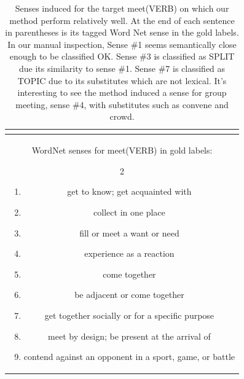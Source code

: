 \documentclass[11pt,a4paper]{article}
\begin{document}
\begin{table}[htp!]
\begin{tabularx}{\linewidth}{| c |  c| X | }
{\begin{itemize}[topsep=0pt,itemsep=0pt, parsep=0pt]
    \end{itemize}}\\
  \hline\hline
    \multicolumn{3}{|p{0.95\linewidth}|}{
    WordNet senses for meet(VERB) in gold labels:
    \begin{multicols}{2}
    \begin{enumerate}[topsep=2pt,itemsep=0pt,partopsep=0pt, parsep=0pt]
        \item get to know; get acquainted with 
        \item collect in one place
        \item fill or meet a want or need
        \item experience as a reaction
        \item come together
        \item be adjacent or come together
        \item get together socially or for a specific purpose
        \item meet by design; be present at the arrival of
        \item contend against an opponent in a sport, game, or battle
        
    \end{enumerate}
    \end{multicols}}
    
    \\
  
  \hline
\end{tabularx}
\caption{Senses induced for the target meet(VERB) on which our method perform relatively well. At the end of each sentence in parentheses is its tagged Word Net sense in the gold labels. In our manual inspection, Sense \#1 seems semantically close enough to be classified OK. Sense \#3 is classified as SPLIT due its similarity to sense \#1. Sense \#7 is classified as TOPIC due to its substitutes which are not lexical. It's interesting to see the method induced a sense for group meeting, sense \#4, with substitutes such as convene and crowd. }
  \label{tab:examples}
\end{table}
\end{document}
